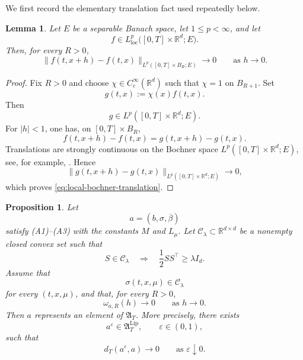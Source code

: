 \documentclass[12pt,oneside, reqno]{amsart}
\newtheorem{lemma}[theorem]{Lemma}
\newtheorem{proposition}[theorem]{Proposition}
\numberwithin{equation}{section}
\begin{document}
	We first record the elementary translation fact used repeatedly below.
	
	\begin{lemma}
		\label{lem:local-bochner-translation}
		Let \(E\) be a separable Banach space, let \(1\leq p<\infty\), and let
		\[
		f\in L^p_{\mathrm{loc}}
		\bigl([0,T]\times\mathbb R^d;E\bigr).
		\]
		Then, for every \(R>0\),
		\begin{equation}
			\label{eq:local-bochner-translation}
			\|f(t,x+h)-f(t,x)\|_{L^p([0,T]\times B_R;E)}
			\longrightarrow0
			\qquad\text{as }h\longrightarrow0.
		\end{equation}
	\end{lemma}
	
	\begin{proof}
		Fix \(R>0\) and choose
		\(\chi\in C_c^\infty(\mathbb R^d)\) such that
		\(\chi=1\) on \(B_{R+1}\). Set
		\[
		g(t,x):=\chi(x)f(t,x).
		\]
		Then
		\[
		g\in L^p([0,T]\times\mathbb R^d;E).
		\]
		For \(|h|<1\), one has, on \([0,T]\times B_R\),
		\[
		f(t,x+h)-f(t,x)=g(t,x+h)-g(t,x).
		\]
		Translations are strongly continuous on the Bochner space
		\(L^p([0,T]\times\mathbb R^d;E)\), see, for example, \cite{Hytonen-2003}. Hence
		\[
		\|g(t,x+h)-g(t,x)\|_{L^p([0,T]\times\mathbb R^d;E)}
		\longrightarrow0,
		\]
		which proves \eqref{eq:local-bochner-translation}.
	\end{proof}
	
	\begin{proposition}
		\label{prop:translation-continuity-completion}
		Let
		\[
		a=(b,\sigma,\overline\beta)
		\]
		satisfy \textnormal{(A1)}--\textnormal{(A3)} with the constants
		\(M\) and \(L_\mu\). Let
		\(\mathcal C_\lambda\subset\mathbb R^{d\times d}\) be a nonempty closed
		convex set such that
		\begin{equation}
			\label{eq:convex-elliptic-matrix-class}
			S\in\mathcal C_\lambda
			\quad\Longrightarrow\quad
			\frac12SS^\top\geq\lambda I_d.
		\end{equation}
		Assume that
		\begin{equation}
			\label{eq:diffusion-in-convex-elliptic-class}
			\sigma(t,x,\mu)\in\mathcal C_\lambda
		\end{equation}
		for every \((t,x,\mu)\), and that, for every \(R>0\),
		\begin{equation}
			\label{eq:translation-continuity-assumption}
			\omega_{a,R}(h)\longrightarrow0
			\qquad\text{as }h\longrightarrow0.
		\end{equation}
		Then \(a\) represents an element of \(\mathfrak A_T\). More precisely,
		there exists
		\[
		a^\varepsilon\in\mathfrak A_T^{\mathrm{Lip}},
		\qquad
		\varepsilon\in(0,1),
		\]
		such that
		\begin{equation}
			\label{eq:mollified-coefficient-convergence}
			d_T(a^\varepsilon,a)\longrightarrow0
			\qquad\text{as }\varepsilon\downarrow0.
		\end{equation}
	\end{proposition}
	
\end{document}
